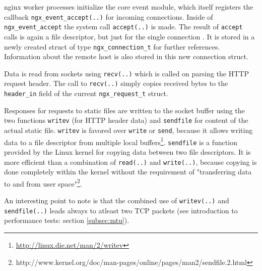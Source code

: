 nginx worker processes initialize the core event module, which itself registers the callback \texttt{ngx\_event\_accept(..)} for incoming connections. Inside of \texttt{ngx\_event\_accept} the system call \texttt{accept(..)} is made. The result of \texttt{accept} calls is again a file descriptor, but just for the single connection \cite{beejs}. It is stored in a newly created struct of type \texttt{ngx\_connection\_t} for further references. Information about the remote host is also stored in this new connection struct.

Data is read from sockets using \texttt{recv(..)} which is called on parsing the HTTP request header. The call to \texttt{recv(..)} simply copies received bytes to the \texttt{header\_in} field of the current \texttt{ngx\_request\_t} struct.

Responses for requests to static files are written to the socket buffer using the two functions \texttt{writev} (for HTTP header data) and \texttt{sendfile} for content of the actual static file. \texttt{writev} is favored over \texttt{write} or \texttt{send}, because it allows writing data to a file descriptor from multiple local buffers\footnote{\url{http://linux.die.net/man/2/writev}}. \texttt{sendfile} is a function provided by the Linux kernel for copying data between two file descriptors. It is more efficient than a combination of \texttt{read(..)} and \texttt{write(..)}, because copying is done completely within the kernel without the requirement of "transferring data to and from user space"\footnote{http://www.kernel.org/doc/man-pages/online/pages/man2/sendfile.2.html}.

An interesting point to note is that the combined use of \texttt{writev(..)} and \texttt{sendfile(..)} leads always to atleast two TCP packets (see introduction to performance tests: section \ref{subsec:mtu}).